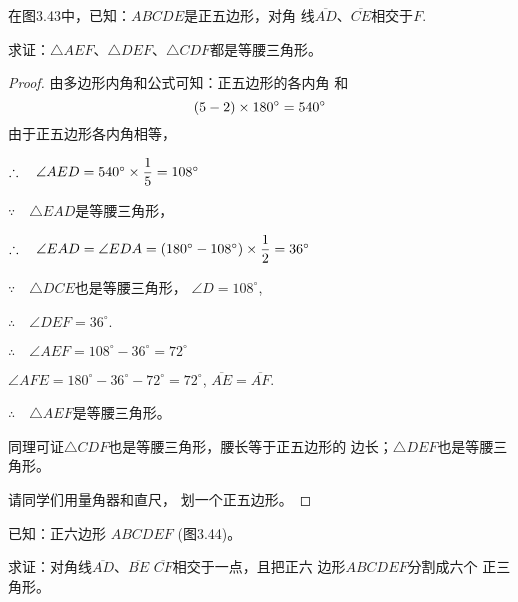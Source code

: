 \begin{example}
    在图3.43中，已知：$ABCDE$是正五边形，对角
    线$\overline{AD}$、$\overline{CE}$相交于$F$.

    求证：$\triangle AEF$、$\triangle DEF$、$\triangle CDF$都是等腰三角形。
\end{example}

\begin{proof}
由多边形内角和公式可知：正五边形的各内角
和
\[(5-2)\times180^{\circ}=540^{\circ}\]
由于正五边形各内角相等，

$\therefore\quad \angle AED=540^{\circ}\times\dfrac{1}{5}=108^{\circ}$

$\because\quad \triangle EAD$是等腰三角形，

$\therefore\quad \angle EAD=\angle EDA=(180^{\circ}-108^{\circ})\times\dfrac{1}{2}=36^{\circ}$

$\because\quad \triangle DCE$也是等腰三角形，
$\angle D=108^{\circ}$,

$\therefore\quad \angle DEF=36^{\circ}$.

$\therefore\quad \angle AEF=108^{\circ}-36^{\circ}=72^{\circ}$

$\angle AFE=180^{\circ}-36^{\circ}-72^{\circ}=72^{\circ}$, $\overline{AE}=\overline{AF}$.

$\therefore\quad \triangle AEF$是等腰三角形。

同理可证$\triangle CDF$也是等腰三角形，腰长等于正五边形的
边长；$\triangle DEF$也是等腰三角形。

请同学们用量角器和直尺，
划一个正五边形。
\end{proof}
    
\begin{example}
    已知：正六边形
    $ABCDEF$ (图3.44)。

    求证：对角线$\overline{AD}$、$\overline{BE}$
    $\overline{CF}$相交于一点，且把正六
    边形$ABCDEF$分割成六个
    正三角形。
\end{example}

\begin{figure}[htp]
    \centering
{}
    \caption{}
\end{figure}

